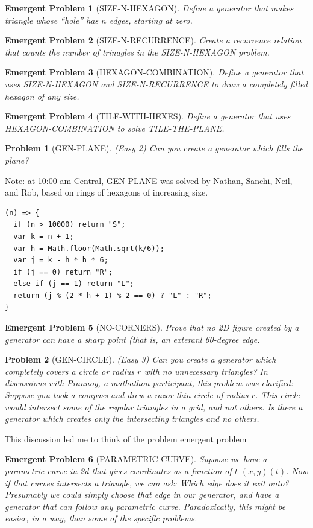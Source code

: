 \documentclass[11pt]{article}
\newtheorem{problem}{Problem}
\newtheorem{eproblem}{Emergent Problem}
\begin{document}
\begin{eproblem}[SIZE-N-HEXAGON]
  Define a generator that makes triangle whose ``hole'' has $n$ edges, starting at zero.
\end{eproblem}
\begin{eproblem}[SIZE-N-RECURRENCE]
  Create a recurrence relation that counts the number of trinagles in the SIZE-N-HEXAGON problem.
\end{eproblem}
\begin{eproblem}[HEXAGON-COMBINATION]
  Define a generator that uses SIZE-N-HEXAGON and SIZE-N-RECURRENCE to draw a completely filled hexagon of any size.
\end{eproblem}
\begin{eproblem}[TILE-WITH-HEXES]
  Define a generator that uses HEXAGON-COMBINATION to solve TILE-THE-PLANE.
\end{eproblem}

\begin{problem}[GEN-PLANE]
(Easy 2) Can you create a generator which fills the plane?  
\end{problem}

Note: at 10:00 am Central, GEN-PLANE was solved by Nathan, Sanchi, Neil, and Rob, based on rings of hexagons of increasing size.

\begin{verbatim}
(n) => {
  if (n > 10000) return "S"; 
  var k = n + 1;
  var h = Math.floor(Math.sqrt(k/6));
  var j = k - h * h * 6;
  if (j == 0) return "R";
  else if (j == 1) return "L";
  return (j % (2 * h + 1) % 2 == 0) ? "L" : "R";
}
\end{verbatim}

\begin{eproblem}[NO-CORNERS]
  Prove that no 2D figure created by a generator can have a sharp point (that is, an exteranl 60-degree edge.
  \end{eproblem}


\begin{problem}[GEN-CIRCLE]
  (Easy 3) Can you create a generator which completely covers a circle or radius $r$ with no unnecessary triangles?
  In discussions with Prannoy, a mathathon participant, this problem was clarified: Suppose you took a compass and
  drew a razor thin circle of radius $r$. This circle would intersect some of the regular triangles in a grid,
  and not others. Is there a generator which creates only the intersecting triangles and no others.
\end{problem}

This discussion led me to think of the problem emergent problem
\begin{eproblem}[PARAMETRIC-CURVE]
  \label{eprob-parametric-curve}
  Supoose we have a parametric curve in 2d that gives coordinates as a function of $t$ $(x,y)(t)$.
  Now if that curves intersects a triangle, we can ask: Which edge does it exit onto? Presumably we could
  simply choose that edge in our generator, and have a generator that can follow any parametric curve.
  Paradoxically, this might be easier, in a way, than some of the specific problems.
\end{eproblem}
\end{document}
